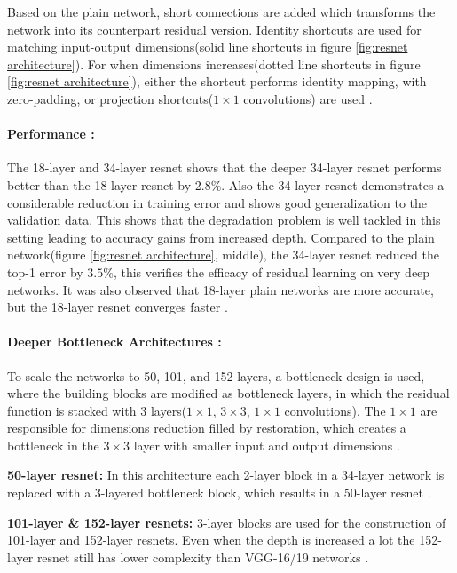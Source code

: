 Based on the plain network, short connections are added which transforms the network into its counterpart residual version. Identity shortcuts are used for matching input-output dimensions(solid line shortcuts in figure \ref{fig:resnet architecture}). For when dimensions increases(dotted line shortcuts in figure \ref{fig:resnet architecture}), either the shortcut performs identity mapping, with zero-padding, or projection shortcuts($1\times1$ convolutions) are used \cite{he2016deep}.

\paragraph*{Performance :}

The 18-layer and 34-layer \gls{resnet} shows that the deeper 34-layer \gls{resnet} performs better than the 18-layer \gls{resnet} by 2.8\%. Also the 34-layer \gls{resnet} demonstrates a considerable reduction in training error and shows good generalization to the validation data. This shows that the degradation problem is well tackled in this setting leading to accuracy gains from increased depth. Compared to the plain network(figure \ref{fig:resnet architecture}, middle), the 34-layer \gls{resnet} reduced the top-1 error by $3.5\%$, this verifies the efficacy of residual learning on very deep networks. It was also observed that 18-layer plain networks are more accurate, but the 18-layer \gls{resnet} converges faster \cite{he2016deep}.

\paragraph*{Deeper Bottleneck Architectures :}

To scale the networks to 50, 101, and 152 layers, a bottleneck design is used, where the building blocks are modified as bottleneck layers, in which the residual function is stacked with 3 layers($1\times1$, $3\times3$, $1\times1$ convolutions). The $1\times1$ are responsible for dimensions reduction filled by restoration, which creates a bottleneck in the $3\times3$ layer with smaller input and output dimensions \cite{he2016deep}.

\textbf{50-layer \gls{resnet}:} In this architecture each 2-layer block in a 34-layer network is replaced with a 3-layered bottleneck block, which results in a 50-layer \gls{resnet} \cite{he2016deep}.

\textbf{101-layer \& 152-layer \glspl{resnet}:} 3-layer blocks are used for the construction of 101-layer and 152-layer \glspl{resnet}. Even when the depth is increased a lot the 152-layer \gls{resnet} still has lower complexity than VGG-16/19 networks \cite{he2016deep}.

